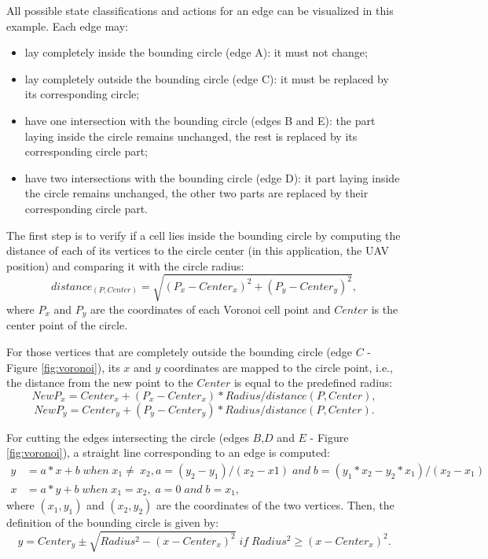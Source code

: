  All possible state classifications and actions for an edge can be visualized in this example. Each edge may:
 
 \begin{itemize}
	\item lay completely inside the bounding circle (edge A): it must not change;
	\item lay completely outside the bounding circle (edge C): it must be replaced by its corresponding circle;
	\item have one intersection with the bounding circle (edges B and E): the part laying inside the circle remains unchanged, the rest is replaced by its corresponding circle part;
	\item have two intersections with the bounding circle (edge D): it part laying inside the circle remains unchanged, the other two parts are replaced by their corresponding circle part.
\end{itemize}

The first step is to verify if a cell lies inside the bounding circle by computing the distance of each of its vertices to the circle center (in this application, the UAV position) and comparing it with the circle radius:
\begin{equation} \label{eq:distance}
distance_{(P,Center)} = \sqrt{(P_x-Center_x)^2 + (P_y-Center_y)^2},
\end{equation}
where $P_x$ and $P_y$ are the coordinates of each Voronoi cell point and $Center$ is the center point of the circle.

For those vertices that are completely outside the bounding circle (edge $C$ - Figure \ref{fig:voronoi}), its $x$ and $y$ coordinates are mapped to the circle point, i.e., the distance from the new point to the $Center$ is equal to the predefined radius:
\begin{equation} \label{eq:newPx}
NewP_x = Center_x + (P_x-Center_x) * Radius/distance(P,Center),
\end{equation}
\begin{equation} \label{eq:newPy}
NewP_y = Center_y + (P_y-Center_y) * Radius/distance(P,Center).
\end{equation}

For cutting the edges intersecting the circle (edges $B$,$D$ and $E$ - Figure \ref{fig:voronoi}), a straight line corresponding to an edge is computed: 
\begin{equation}
\begin{aligned}\label{eq:lineEdge}
y &= a*x+b \;when\; x_1 \neq\ x_2, a=(y_2-y_1)/(x_2-x 1 ) \;and\; b=(y_1 *x_2-y_2*x_1)/(x_2-x_1) \\
x &= a*y+b \;when\; x_1 = x_2, \; a=0 \;and\;  b=x_1, 
\end{aligned}
\end{equation}
where $(x_1,y_1)$ and $(x_2,y_2)$ are the coordinates of the two vertices. Then, the definition of the bounding circle is given by:
\begin{equation} \label{eq:boundingCircle}
y = Center_y \pm \sqrt{Radius^2 - {(x-Center_x)^2}} \; if \;  Radius^2 \geq  {(x-Center_x)^2}.
\end{equation}

